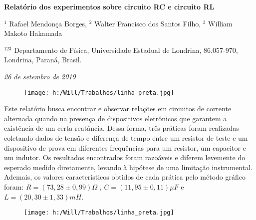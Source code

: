 \documentclass[a4paper, 12pt]{article}
\begin{document}
\begin{center}
\large\textbf{Relatório dos experimentos sobre circuito RC e circuito RL}\\
\end{center}
\begin{center}
\small
$^{1}$ Rafael Mendonça Borges, $^{2}$ Walter Francisco dos Santos Filho, $^{3}$ William Makoto Hakamada \\
\end{center}
\begin{center}
\small
$^{123}$ Departamento de Física, Universidade Estadual de Londrina, 86.057-970, Londrina, Paraná, Brasil. \\

\end{center}
\begin{center}
\textit{26 de setembro de 2019}
\end{center}
        \begin{figure}[!ht]
        \centering
        \texttt{[image: h:/Will/Trabalhos/linha\_preta.jpg]}
        \end{figure}
\noindent Este relatório busca encontrar e observar relações em circuitos de corrente alternada quando na presença de dispositivos eletrônicos que garantem a existência de um certa reatância. Dessa forma, três práticas foram realizadas coletando dados de tensão e diferença de tempo entre um resistor de teste e um dispositivo de prova em diferentes frequências para um resistor, um capacitor e um indutor. Os resultados encontrados foram razoáveis e diferem levemente do esperado medido diretamente, levando à hipótese de uma limitação instrumental. Ademais, os valores característicos obtidos de cada prática pelo método gráfico foram: $R = (73,28\pm 0,99) \Omega$ , $C = (11,95\pm 0,11) \mu F$ e $L = (20,30\pm 1,33) mH$.
        \begin{figure}[!ht]
        \centering
        \texttt{[image: h:/Will/Trabalhos/linha\_preta.jpg]}
        \end{figure}
\end{document}
